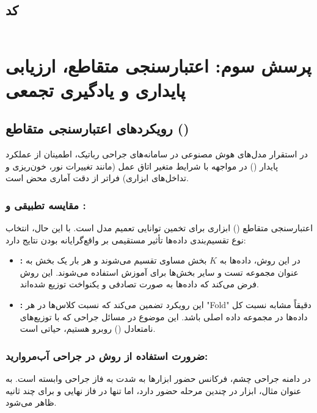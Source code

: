 \documentclass{article}
\begin{document}
\subsection{کد}
\begin{LTR}
	\inputminted{python}{code/rc_hw3_q2.py}
\end{LTR}
\newpage

\section{پرسش سوم: اعتبارسنجی متقاطع، ارزیابی پایداری و یادگیری تجمعی}
\subsection{رویکردهای اعتبارسنجی متقاطع ()}

در استقرار مدل‌های هوش مصنوعی در سامانه‌های جراحی رباتیک، اطمینان از عملکرد پایدار () در مواجهه با شرایط متغیر اتاق عمل (مانند تغییرات نور، خون‌ریزی و تداخل‌های ابزاری) فراتر از دقت آماری محض است. 

\subsubsection{مقایسه تطبیقی  و :}

اعتبارسنجی متقاطع () ابزاری برای تخمین توانایی تعمیم مدل است. با این حال، انتخاب نوع تقسیم‌بندی داده‌ها تأثیر مستقیمی بر واقع‌گرایانه بودن نتایج دارد:

\begin{itemize}
	\item \textbf{:} در این روش، داده‌ها به $K$ بخش مساوی تقسیم می‌شوند و هر بار یک بخش به عنوان مجموعه تست و سایر بخش‌ها برای آموزش استفاده می‌شوند. این روش فرض می‌کند که داده‌ها به صورت تصادفی و یکنواخت توزیع شده‌اند.
	\item \textbf{:} این رویکرد تضمین می‌کند که نسبت کلاس‌ها در هر "Fold" دقیقاً مشابه نسبت کل داده‌ها در مجموعه داده اصلی باشد. این موضوع در مسائل جراحی که با توزیع‌های نامتعادل () روبرو هستیم، حیاتی است.
\end{itemize}

\subsubsection{ضرورت استفاده از روش  در جراحی آب‌مروارید:}

در دامنه جراحی چشم، فرکانس حضور ابزارها به شدت به فاز جراحی وابسته است. به عنوان مثال، ابزار  در چندین مرحله حضور دارد، اما  تنها در فاز نهایی و برای چند ثانیه ظاهر می‌شود. 
\end{document}

